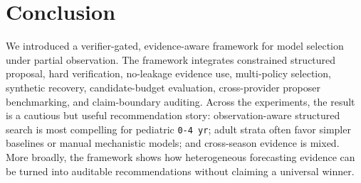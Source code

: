 \section{Conclusion}

We introduced a verifier-gated, evidence-aware framework for model selection
under partial observation. The framework integrates constrained structured
proposal, hard verification, no-leakage evidence use, multi-policy selection,
synthetic recovery, candidate-budget evaluation, cross-provider proposer
benchmarking, and claim-boundary auditing. Across the experiments, the result
is a cautious but useful recommendation story: observation-aware structured
search is most compelling for pediatric \texttt{0-4 yr}; adult strata often
favor simpler baselines or manual mechanistic models; and cross-season
evidence is mixed. More broadly, the framework shows how heterogeneous
forecasting evidence can be turned into auditable recommendations without
claiming a universal winner.
